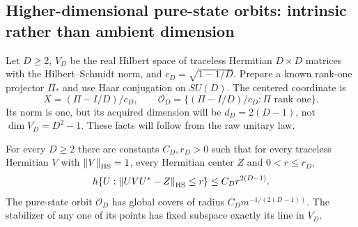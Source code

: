 \subsection{Higher-dimensional pure-state orbits: intrinsic rather than ambient dimension}
Let $D\ge2$, $V_D$ be the real Hilbert space of traceless Hermitian $D\times D$ matrices with the Hilbert--Schmidt norm, and $c_D=\sqrt{1-1/D}$. Prepare a known rank-one projector $\Pi_*$ and use Haar conjugation on $SU(D)$. The centered coordinate is
\[
 X=(\Pi-I/D)/c_D,\qquad
 \mathcal O_D=\{(\Pi-I/D)/c_D:\Pi\text{ rank one}\}.
\]
Its norm is one, but its acquired dimension will be $d_D=2(D-1)$, not $\dim V_D=D^2-1$. These facts will follow from the raw unitary law.

\begin{lemma}\label{lem:quantum-orbits}
For every $D\ge2$ there are constants $C_D,r_D>0$ such that for every traceless Hermitian $V$ with $\left\lVert V\right\rVert_{\rm HS}=1$, every Hermitian center $Z$ and $0<r\le r_D$,
\begin{equation}\label{eq:unitary-smallball}
 h\{U:\left\lVert UVU^*-Z\right\rVert_{\rm HS}\le r\}\le C_D r^{2(D-1)}.
\end{equation}
The pure-state orbit $\mathcal O_D$ has global covers of radius $C_Dm^{-1/(2(D-1))}$. The stabilizer of any one of its points has fixed subspace exactly its line in $V_D$.
\end{lemma}
